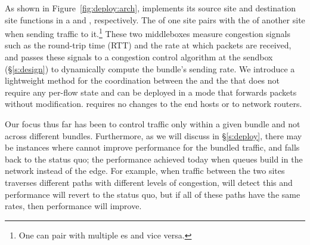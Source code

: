 



As shown in Figure~\ref{fig:deploy:arch}, \name implements its source site and destination site functions in a \emph{\inbox} and \emph{\outbox}, respectively. The \inbox of one site pairs with the \outbox of another site when sending traffic to it.\footnote{One \inbox can pair with multiple {\outbox}es and vice versa.} 
These two middleboxes measure congestion signals such as the round-trip time (RTT) and the rate at which packets are received, and passes these signals to a congestion control algorithm at the sendbox (\S\ref{s:design}) to dynamically compute the bundle's sending rate.
We introduce a lightweight method for the coordination between the \inbox and the \outbox that does not require any per-flow state and can be deployed in a mode that forwards packets without modification.  \name requires no changes to the end hosts or to network routers.
 
Our focus thus far has been to control traffic only within a given bundle and not across different bundles. 
Furthermore, as we will discuss in \S\ref{s:deploy}, there may be instances where \name cannot improve performance for the bundled traffic, and falls back to the status quo; \ie the performance achieved today when queues build in the network instead of the edge. For example, when traffic between the two sites traverses different paths with different levels of congestion, \name will detect this and performance will revert to the status quo, but if all of these paths have the same rates, then performance will improve. 

